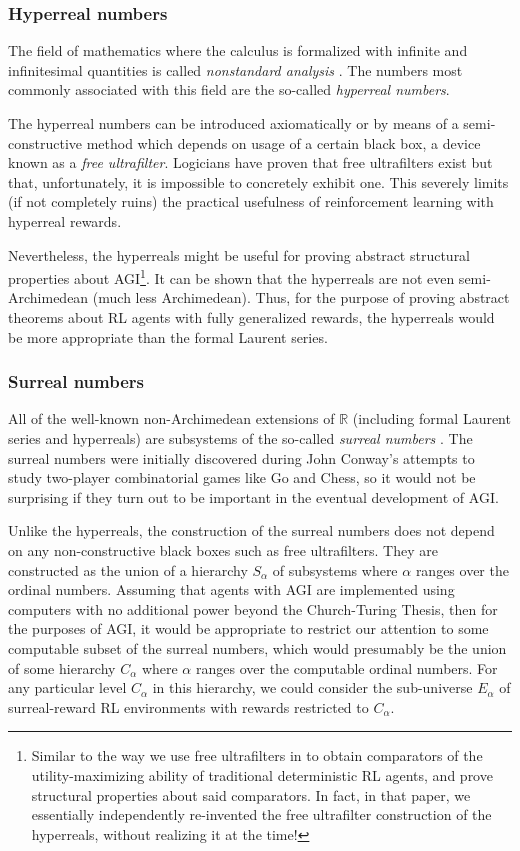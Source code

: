 \documentclass[twoside,11pt]{article}
\begin{document}
\subsubsection{Hyperreal numbers}

The field of mathematics where the calculus is formalized with infinite and infinitesimal
quantities is called \emph{nonstandard analysis} \citep{robinson}. The numbers most
commonly associated with this field are the so-called \emph{hyperreal numbers}.

The hyperreal numbers can be
introduced axiomatically or by means of a semi-constructive method which depends on
usage of a certain black box, a device known as a \emph{free ultrafilter}. Logicians
have proven that free ultrafilters exist but that, unfortunately, it is impossible to
concretely exhibit one. This severely limits (if not completely ruins) the practical
usefulness of reinforcement learning with hyperreal rewards.

Nevertheless, the hyperreals
might be useful for proving abstract structural properties about AGI\footnote{Similar to
the way we use free ultrafilters in \citep{alexander2019intelligence} to obtain
comparators of the utility-maximizing ability of traditional deterministic RL agents,
and prove structural properties about said comparators.
In fact, in that paper, we essentially independently re-invented the free ultrafilter
construction of the hyperreals, without realizing it at the time!}.
It can be shown that the hyperreals are not even semi-Archimedean (much less Archimedean).
Thus, for the purpose of
proving abstract theorems about RL agents with fully generalized rewards, the hyperreals
would be more appropriate than the formal Laurent series.


\subsubsection{Surreal numbers}

All of the
well-known non-Archimedean extensions of $\mathbb R$
(including formal Laurent series and hyperreals) are subsystems of the
so-called \emph{surreal numbers}
\citep{conway, knuth, ehrlich2012absolute}. The surreal
numbers were initially discovered during John Conway's attempts to study
two-player combinatorial games like Go and Chess, so it would not be
surprising if they turn out to be important in the eventual development of
AGI.

Unlike the hyperreals,
the construction of the surreal numbers does not depend on any
non-constructive black boxes such as free ultrafilters.
They are constructed as the union of a hierarchy $S_\alpha$ of subsystems where
$\alpha$ ranges over the ordinal numbers. Assuming that agents with AGI are
implemented using computers with no additional power beyond the Church-Turing
Thesis, then for the purposes of AGI, it would be appropriate to restrict our
attention to some computable subset of the surreal numbers, which would
presumably be the union of
some hierarchy $C_\alpha$ where $\alpha$ ranges over the computable ordinal numbers.
For any particular level $C_\alpha$ in this hierarchy, we could consider the
sub-universe $E_\alpha$ of surreal-reward RL environments with rewards restricted
to $C_\alpha$.
\end{document}
